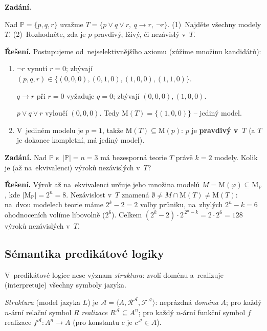 \documentclass[11pt,a4paper]{article}
\newcommand{\Mset}{\mathrm{M}}              %
\begin{document}
\begin{priklad}
\textbf{Zadání.}\par
Nad $\mathbb{P}=\{p,q,r\}$ uvažme $T=\{p\vee q\vee r,\ q\to r,\ \neg r\}$. (1)~Najděte všechny modely $T$. (2)~Rozhodněte, zda je $p$ pravdivý, lživý, či nezávislý v~$T$.

\smallskip
\textbf{Řešení.} Postupujeme od~nejselektivnějšího axiomu (zúžíme množinu kandidátů):
\begin{enumerate}[label=(\arabic*)]
  \item $\neg r$ vynutí $r=0$; zbývají $(p,q,r)\in\{(0,0,0),(0,1,0),(1,0,0),(1,1,0)\}$.\par
    $q\to r$ při $r=0$ vyžaduje $q=0$; zbývají $(0,0,0),(1,0,0)$.\par
    $p\vee q\vee r$ vyloučí $(0,0,0)$. Tedy $\boxed{\Mset(T)=\{(1,0,0)\}}$ -- jediný model.
  \item V~jediném modelu je $p=1$, takže $\Mset(T)\subseteq\Mset(p)$: $p$ je \textbf{pravdivý v~$T$} (a $T$ je dokonce kompletní, má jediný model).
\end{enumerate}
\end{priklad}

\begin{priklad}
\textbf{Zadání.} Nad $\mathbb{P}$ s~$|\mathbb{P}|=n=3$ má bezesporná teorie $T$ právě $k=2$ modely. Kolik je (až na~ekvivalenci) výroků nezávislých v~$T$?

\smallskip
\textbf{Řešení.} Výrok až na~ekvivalenci určuje jeho množina modelů $M=\Mset(\varphi)\subseteq\Mset_{\mathbb{P}}$, kde $|\Mset_{\mathbb{P}}|=2^n=8$. Nezávislost v~$T$ znamená $\emptyset\neq M\cap\Mset(T)\neq\Mset(T)$: na~dvou modelech teorie máme $2^k-2=2$  volby průniku, na~zbylých $2^n-k=6$ ohodnoceních volíme libovolně ($2^6$). Celkem $(2^k-2)\cdot2^{\,2^n-k}=2\cdot2^{6}=\boxed{128}$ výroků nezávislých v~$T$.
\end{priklad}

\subsection{Sémantika predikátové logiky}

V~predikátové logice nese význam \emph{struktura}: zvolí doménu a~realizuje (interpretuje) všechny symboly jazyka.

\begin{definice}
\emph{Struktura} (model jazyka $L$) je $\mathcal A=\langle A,\mathcal R^{\mathcal A},\mathcal F^{\mathcal A}\rangle$: neprázdná \emph{doména} $A$; pro každý $n$-ární relační symbol $R$ \emph{realizace} $R^{\mathcal A}\subseteq A^n$; pro každý $n$-ární funkční symbol $f$ realizace $f^{\mathcal A}\colon A^n\to A$ (pro konstantu $c$ je $c^{\mathcal A}\in A$).
\end{definice}
\end{document}
